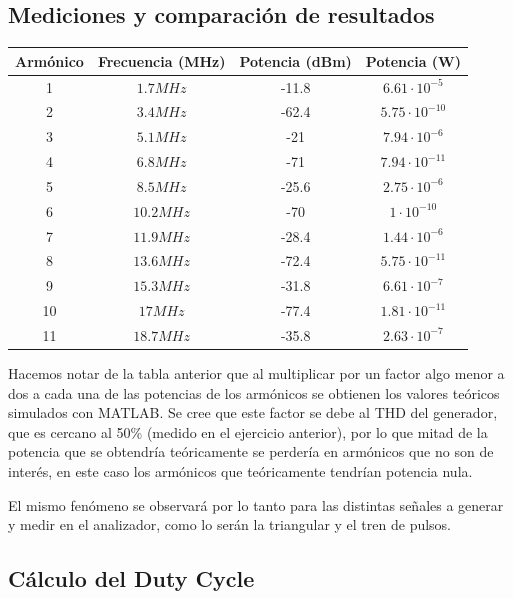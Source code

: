 \documentclass[../../labo_tp5_main.tex]{subfiles}
\begin{document}
\subsection{Mediciones y comparación de resultados}

\begin{table}[H] %
	\centering
 		\begin{tabular}{||c c c c||} 
 			\hline
			Armónico & Frecuencia (MHz) & Potencia (dBm) & Potencia (W)\\ [0.5ex] 
 			\hline\hline
			1 & $1.7MHz$ & -11.8 & $6.61\cdot 10^{-5}$\\
			2 & $3.4MHz$ & -62.4 & $5.75\cdot 10^{-10}$\\
			3 & $5.1MHz$ & -21 & $7.94\cdot 10^{-6}$\\
			4 & $6.8MHz$ & -71 & $7.94\cdot 10^{-11}$\\
			5 & $8.5MHz$ & -25.6 & $2.75\cdot 10^{-6}$\\
			6 & $10.2MHz$ & -70 & $1\cdot 10^{-10}$\\
			7 & $11.9MHz$ & -28.4 & $1.44\cdot 10^{-6}$\\
			8 & $13.6MHz$ & -72.4 & $5.75\cdot 10^{-11}$\\
			9 & $15.3MHz$ & -31.8 & $6.61\cdot 10^{-7}$\\
			10 & $17MHz$ & -77.4 & $1.81\cdot 10^{-11}$\\
			11 & $18.7MHz$ & -35.8 & $2.63\cdot 10^{-7}$\\[1ex] 
			\hline
		\end{tabular}
\end{table}
Hacemos notar de la tabla anterior que al multiplicar por un factor algo menor a dos a cada una de las potencias de los armónicos se obtienen los valores teóricos simulados con MATLAB. Se cree que este factor se debe al THD del generador, que es cercano al 50\% (medido en el ejercicio anterior), por lo que mitad de la potencia que se obtendría teóricamente se perdería en armónicos que no son de interés, en este caso los armónicos que teóricamente tendrían potencia nula. \par
El mismo fenómeno se observará por lo tanto para las distintas señales a generar y medir en el analizador, como lo serán la triangular y el tren de pulsos.\par

\subsection{Cálculo del Duty Cycle}
\end{document}
